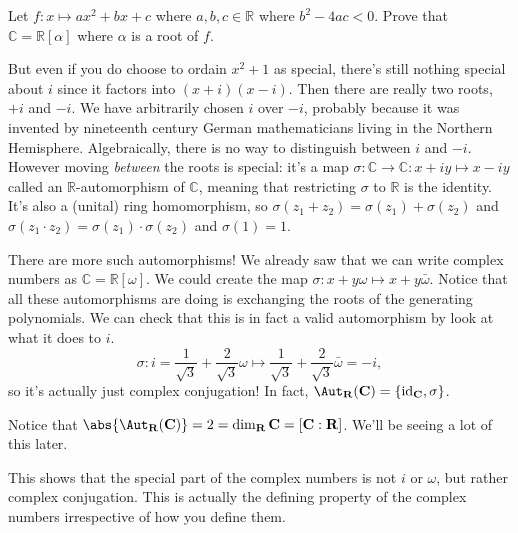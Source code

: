 \begin{exercise}
Let $f\colon x \mapsto ax^2+bx+c$ where $a,b,c \in \mathbb{R}$ where $b^2-4ac < 0$. Prove that $\mathbb{C} = \mathbb{R}[\alpha]$ where $\alpha$ is a root of $f$.
\end{exercise}

But even if you do choose to ordain $x^2+1$ as special, there's still nothing special about $i$ since it factors into $(x+i)(x-i)$. Then there are really two roots, $+i$ and $-i$. We have arbitrarily chosen $i$ over $-i$, probably because it was invented by nineteenth century German mathematicians living in the Northern Hemisphere. Algebraically, there is no way to distinguish between $i$ and $-i$. However moving \emph{between} the roots is special: it's a map $\sigma \colon \mathbb{C} \to \mathbb{C} : x + iy \mapsto x-iy$ called an $\mathbb{R}$-automorphism of $\mathbb{C}$, meaning that restricting $\sigma$ to $\mathbb{R}$ is the identity. It's also a (unital) ring homomorphism, so $\sigma(z_1 + z_2) = \sigma(z_1) + \sigma(z_2)$ and $\sigma(z_1 \cdot z_2) = \sigma(z_1) \cdot \sigma(z_2)$ and $\sigma(1) = 1$.

There are more such automorphisms! We already saw that we can write complex numbers as $\mathbb{C} = \mathbb{R}[\omega]$. We could create the map $\sigma\colon x + y\omega \mapsto x + y\bar{\omega}$. Notice that all these automorphisms are doing is exchanging the roots of the generating polynomials. We can check that this is in fact a valid automorphism by look at what it does to $i$.
\[ \sigma\colon i = \frac{1}{\sqrt{3}} + \frac{2}{\sqrt{3}}\omega \mapsto \frac{1}{\sqrt{3}} + \frac{2}{\sqrt{3}}\bar{\omega} = -i, \]
so it's actually just complex conjugation! In fact, $\Aut_{\mathbb{R}}(\mathbb{C}) = \{\operatorname{id}_{\mathbb{C}}, \sigma\}$. 

\begin{example}
Notice that $\abs{\Aut_{\mathbb{R}}(\mathbb{C})} = 2 = \dim_{\mathbb{R}}\mathbb{C} = [\mathbb{C} : \mathbb{R}]$. We'll be seeing a lot of this later.
\end{example}

This shows that the special part of the complex numbers is not $i$ or $\omega$, but rather complex conjugation. This is actually the defining property of the complex numbers irrespective of how you define them. 

